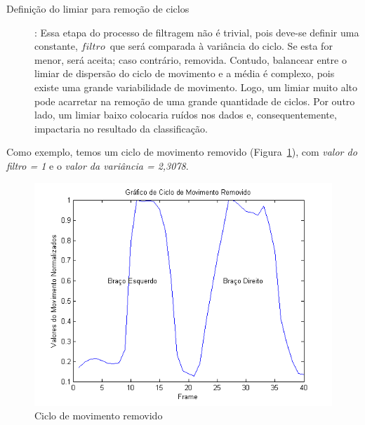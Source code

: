 \begin{description}
		
	\item [Definição do limiar para remoção de ciclos]: Essa etapa do processo de filtragem não é trivial, pois deve-se definir uma constante, $ filtro $\, que será comparada à variância do ciclo. Se esta for menor, será aceita; caso contrário, removida. Contudo, balancear entre o limiar de dispersão do ciclo de movimento e a média é complexo, pois existe uma grande variabilidade de movimento. Logo, um limiar muito alto pode acarretar na remoção de uma grande quantidade de ciclos. Por outro lado, um limiar baixo colocaria ruídos nos dados e, consequentemente, impactaria no resultado da classificação.	
\end{description}


Como exemplo, temos um ciclo de movimento removido (Figura~\ref{img:ciclo_filtrado}), com \textit{valor do filtro = 1} e o \textit{valor da variância = 2,3078}.

\begin{figure}[!htb]
     \centering
     \includegraphics[width=1\textwidth]{./img/ciclomovimentoremovido.png}
     \caption{Ciclo de movimento removido}
		 \label{img:ciclo_filtrado}
\end{figure}


